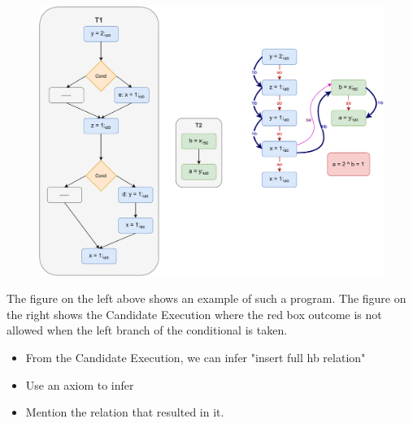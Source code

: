 
            \begin{figure}
                \centering 
                \includegraphics[scale=0.7]{InstructionReordering/CounterExamples3a(Conditionals).pdf}
                \caption{}
            \end{figure}
            The figure on the left above shows an example of such a program.  
            The figure on the right shows the Candidate Execution where the red box outcome is not allowed when the left branch of the conditional is taken.
            \begin{itemize}
                \item From the Candidate Execution, we can infer "insert full hb relation"
                \item Use an axiom to infer 
                \item Mention the relation that resulted in it.
            \end{itemize}

